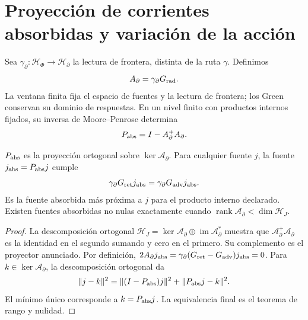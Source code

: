 \section{Proyección de corrientes absorbidas y variación de la acción}
\label{x_reciprocidad:vii:subsec:proyeccion-absorcion}

Sea \(\gamma_\partial:\mathcal H_\Phi\to\mathcal H_\partial\)
la lectura de frontera, distinta de la ruta \(\gamma\). Definimos
\[
 \mathcal A_\partial=\gamma_\partial G_{\rm rad}.
\]
La ventana finita fija el espacio de fuentes y la lectura de frontera;
los Green conservan su dominio de respuestas. En un nivel finito con
productos internos fijados, su inversa de
Moore--Penrose determina
\begin{equation}
 P_{\rm abs}=I-\mathcal A_\partial^+\mathcal A_\partial.
 \label{x_reciprocidad:vii:eq:proyector-absorcion}
\end{equation}

\begin{theorem}
\label{x_reciprocidad:vii:thm:proyeccion-absorcion}
\(P_{\rm abs}\) es la proyección ortogonal sobre
\(\ker\mathcal A_\partial\). Para cualquier fuente \(j\), la fuente
\(j_{\rm abs}=P_{\rm abs}j\) cumple
\begin{equation}
 \gamma_\partial G_{\rm ret}j_{\rm abs}
 =\gamma_\partial G_{\rm adv}j_{\rm abs}.
 \label{x_reciprocidad:vii:eq:igualdad-borde-absorbido}
\end{equation}
Es la fuente absorbida más próxima a \(j\) para el producto interno
declarado. Existen fuentes absorbidas no nulas exactamente cuando
\(\operatorname{rank}\mathcal A_\partial<\dim\mathcal H_J\).
\end{theorem}
\begin{proof}
La descomposición ortogonal
\(\mathcal H_J=\ker\mathcal A_\partial\oplus
 \operatorname{im}\mathcal A_\partial^*\) muestra que
\(\mathcal A_\partial^+\mathcal A_\partial\) es la identidad
en el segundo sumando y cero en el primero. Su complemento es el
proyector anunciado. Por definición,
\(2\mathcal A_\partial j_{\rm abs}
 =\gamma_\partial(G_{\rm ret}-G_{\rm adv})j_{\rm abs}=0\).
Para \(k\in\ker\mathcal A_\partial\), la descomposición ortogonal da
\[
 \|j-k\|^2=\|(I-P_{\rm abs})j\|^2+\|P_{\rm abs}j-k\|^2.
\]
El mínimo único corresponde a \(k=P_{\rm abs}j\).
La equivalencia final es el teorema de rango y nulidad.
\end{proof}

